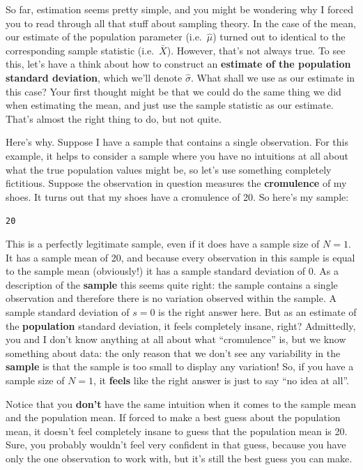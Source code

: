 \documentclass[
  letterpaper,
  DIV=11,
  numbers=noendperiod]{scrreprt}
\begin{document}
So far, estimation seems pretty simple, and you might be wondering why I
forced you to read through all that stuff about sampling theory. In the
case of the mean, our estimate of the population parameter
(i.e.~\(\hat\mu\)) turned out to identical to the corresponding sample
statistic (i.e.~\(\bar{X}\)). However, that's not always true. To see
this, let's have a think about how to construct an \textbf{estimate of
the population standard deviation}, which we'll denote \(\hat\sigma\).
What shall we use as our estimate in this case? Your first thought might
be that we could do the same thing we did when estimating the mean, and
just use the sample statistic as our estimate. That's almost the right
thing to do, but not quite.

Here's why. Suppose I have a sample that contains a single observation.
For this example, it helps to consider a sample where you have no
intuitions at all about what the true population values might be, so
let's use something completely fictitious. Suppose the observation in
question measures the \textbf{cromulence} of my shoes. It turns out that
my shoes have a cromulence of 20. So here's my sample:

\texttt{20}

This is a perfectly legitimate sample, even if it does have a sample
size of \(N=1\). It has a sample mean of 20, and because every
observation in this sample is equal to the sample mean (obviously!) it
has a sample standard deviation of 0. As a description of the
\textbf{sample} this seems quite right: the sample contains a single
observation and therefore there is no variation observed within the
sample. A sample standard deviation of \(s = 0\) is the right answer
here. But as an estimate of the \textbf{population} standard deviation,
it feels completely insane, right? Admittedly, you and I don't know
anything at all about what ``cromulence'' is, but we know something
about data: the only reason that we don't see any variability in the
\textbf{sample} is that the sample is too small to display any
variation! So, if you have a sample size of \(N=1\), it \textbf{feels}
like the right answer is just to say ``no idea at all''.

Notice that you \textbf{don't} have the same intuition when it comes to
the sample mean and the population mean. If forced to make a best guess
about the population mean, it doesn't feel completely insane to guess
that the population mean is 20. Sure, you probably wouldn't feel very
confident in that guess, because you have only the one observation to
work with, but it's still the best guess you can make.
\end{document}
